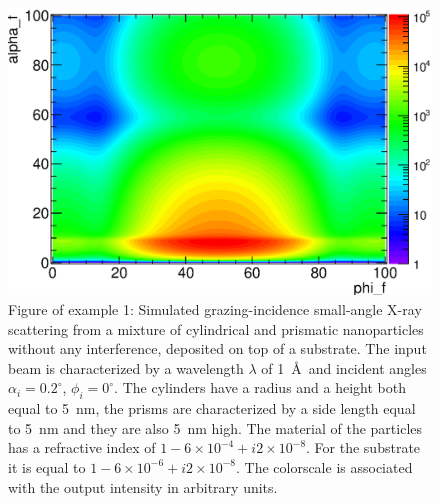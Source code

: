 \begin{figure}[h]
  \begin{center}
   \includegraphics[clip=true, width=120mm]{Figures/Manual_ex1.eps}
  \end{center}
  \caption[Example 1: Simulated grazing-incidence small-angle X-ray scattering from a mixture of
cylindrical and prismatic nanoparticles without any interference, deposited on top
of a substrate]{Figure of example 1: Simulated grazing-incidence small-angle X-ray scattering from a mixture of
cylindrical and prismatic nanoparticles without any interference, deposited on top
of a substrate. The input beam is characterized by a wavelength
$\lambda$ of 1~\AA\ and incident angles $\alpha_i=0.2^{\circ}$, $\phi_i=0^{\circ}$. The
cylinders have a radius and a height both equal to 5~nm, the prisms
are characterized by a side length equal to 5~nm and they are also 5~nm high. The
material of the particles has a refractive index of $1-6\times 10^{-4}+i2\times 10^{-8}$. For the substrate
it is equal to $1-6\times 10^{-6} +i2\times 10^{-8} $. The colorscale
is associated with the output intensity in arbitrary units. }
\label{fig:output_ex1}
\end{figure}


